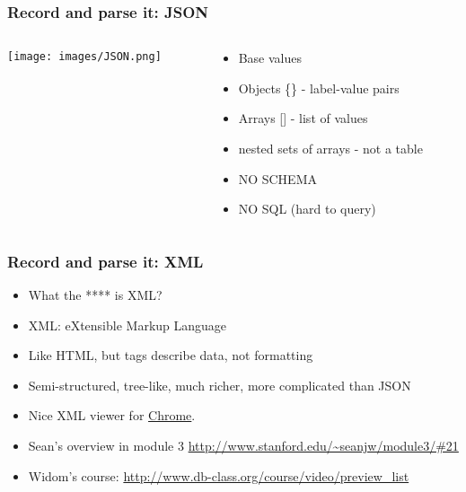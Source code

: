 \documentclass[]{beamer}
\begin{document}
\begin{frame}
\frametitle{Record and parse it: JSON}   %
\begin{columns}[onlytextwidth]
\begin{column}{.5\textwidth}
\centering
\texttt{[image: images/JSON.png]}
\end{column}
\begin{column}{.4\textwidth}
\begin{itemize}
  \item Base values\\
  \item Objects \{\}  - label-value pairs\\
  \item Arrays [] - list of values\\
  \item nested sets of arrays - not a table\\
  \item NO SCHEMA\\
  \item NO SQL (hard to query)\\
\end{itemize}
\end{column}
\end{columns}
\end{frame}

\begin{frame}
\frametitle{Record and parse it: XML}   %
\begin{itemize}
  \item What the **** is XML?
  \item XML: eXtensible Markup Language
  \item Like HTML, but tags describe data, not formatting
  \item Semi-structured, tree-like, much richer, more complicated than JSON
  \item Nice XML viewer for \href{https://chrome.google.com/webstore/detail/eeocglpgjdpaefaedpblffpeebgmgddk}{\color{blue} Chrome}.
  \item Sean's overview in module 3 \url{http://www.stanford.edu/~seanjw/module3/\#21}
  \item Widom's course: \url{http://www.db-class.org/course/video/preview_list}
\end{itemize}
\end{frame}
\end{document}
